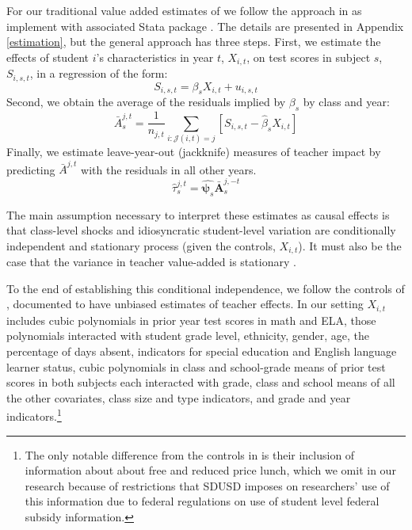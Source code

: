 \documentclass[12pt]{article}
\theoremstyle{definition}
\theoremstyle{definition}
\theoremstyle{definition}
\theoremstyle{definition}
\begin{document}
For our traditional value added estimates of we follow the approach in \citet{chetty2014measuring1} as implement with associated Stata package \citep{vam_stata_ado}. The details are presented in Appendix \ref{estimation}, but the general approach has three steps. First, we estimate the effects of student $i$'s characteristics in year $t$, $X_{i,t}$, on test scores in subject $s$, $S_{i,s,t}$, in a regression of the form:
\begin{equation}
S_{i,s,t} =  \beta_s X_{i, t} + u_{i,s,t} \nonumber
\end{equation}
\noindent %
Second, we obtain the average of the residuals implied by $\beta_s$ by class and year:
\begin{equation}
\bar{A}^{j,t}_{s} = \frac{1}{n_{j,t}} \sum_{i:\mathcal{J}(i,t) = j} \left [ S_{i,s,t} - \hat{\beta}_s X_{i, t} \right ] \nonumber
\end{equation}
\noindent Finally, we estimate leave-year-out (jackknife) measures of teacher impact by predicting $\bar{A}^{j,t}$ with the residuals in all other years.
\begin{equation}
\hat{\tau}^{j,t}_s = \hat{\bm{\psi}_s} \bar{\bm{A}}^{j,-t}_s
\end{equation}

The main assumption necessary to interpret these estimates as causal effects is that class-level shocks and idiosyncratic student-level variation are conditionally independent and stationary process (given the controls, $X_{i,t}$). It must also be the case that the variance in teacher value-added is stationary \citep[as outlined in][---again formal details are in Appendix \ref{estimation}]{chetty2014measuring1}.

To the end of establishing this conditional independence, we follow the controls of \citet{chetty2014measuring1}, documented to have unbiased estimates of teacher effects. In our setting $X_{i,t}$ includes cubic polynomials in prior year test scores in math and ELA, those polynomials interacted with student grade level, ethnicity, gender, age, the percentage of days absent, indicators for special education and English language learner status, cubic polynomials in class and school-grade means of prior test scores in both subjects each interacted with grade, class and school means of all the other covariates, class size and type indicators, and grade and year indicators.\footnote{The only notable difference from the controls in \citet{chetty2014measuring1} is their inclusion of information about about free and reduced price lunch, which we omit in our research because of restrictions that SDUSD imposes on researchers' use of this information due to federal regulations on use of student level federal subsidy information.}
\end{document}

